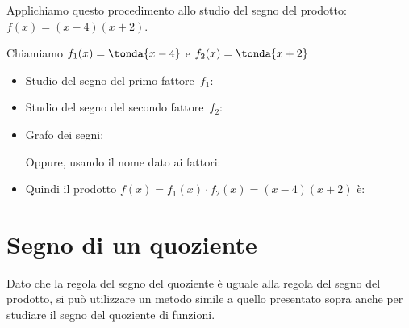 \begin{esempio}{}{}
Applichiamo questo procedimento allo studio del segno del 
prodotto: \\
\(f(x)=(x-4)(x+2)\).

Chiamiamo \(f_1(x)=\tonda{x-4}\) \quad e \quad \(f_2(x)=\tonda{x+2}\)

\begin{itemize} [noitemsep, left=0mm]
\item Studio del segno del primo fattore~\(f_1\):\\
\hspace*{-5mm} 
\item Studio del segno del secondo fattore~\(f_2\):\\
\hspace*{-5mm} 
\item Grafo dei segni:

\segnoprodottoa

Oppure, usando il nome dato ai fattori: 

\segnoprodottoas

\item Quindi il prodotto 
\(f(x) = f_1(x) \cdot f_2(x)=(x -4)(x +2)\) è:\\[.2em]
\begin{itemize} [noitemsep, left=0mm]
\end{itemize}
\end{itemize}
\end{esempio}

\section{Segno di un quoziente}
\label{sec:dis_quoziente}
Dato che la regola del segno del quoziente è uguale alla regola del 
segno del prodotto,
si può utilizzare un metodo simile a quello presentato sopra anche 
per studiare il segno del quoziente di funzioni.

